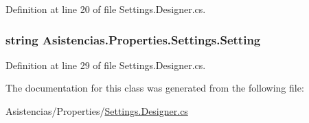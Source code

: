Definition at line 20 of file Settings.\-Designer.\-cs.

\hypertarget{class_asistencias_1_1_properties_1_1_settings_aade5c3d45e89053882a73b3d940ec9dd}{
\subsubsection[{Setting}]{\setlength{\rightskip}{0pt plus 5cm}string Asistencias.\-Properties.\-Settings.\-Setting\hspace{0.3cm}{\ttfamily [get]}}}\label{class_asistencias_1_1_properties_1_1_settings_aade5c3d45e89053882a73b3d940ec9dd}


Definition at line 29 of file Settings.\-Designer.\-cs.



The documentation for this class was generated from the following file\-:\begin{DoxyCompactItemize}
\item 
Asistencias/\-Properties/\hyperlink{_asistencias_2_properties_2_settings_8_designer_8cs}{Settings.\-Designer.\-cs}\end{DoxyCompactItemize}
